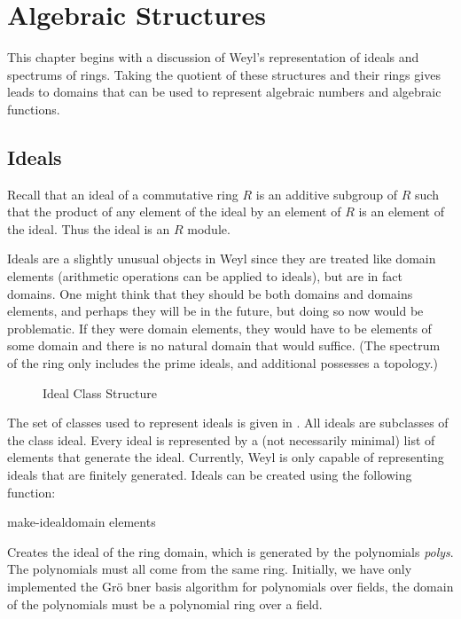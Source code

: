 \chapter{Algebraic Structures}
  
This chapter begins with a discussion
of Weyl's representation of ideals and spectrums of
rings. Taking the quotient of these structures and their
rings gives leads to domains that can be used to represent
algebraic numbers and algebraic functions.

\section{Ideals}
  
Recall that an ideal of a commutative ring $R$ is an additive
subgroup of $R$ such that the product of any element of the ideal by
an element of $R$ is an element of the ideal. Thus the ideal is an $R$
module.
  
Ideals are a slightly unusual objects in Weyl since they are treated
like domain elements (arithmetic operations can be applied to ideals),
but are in fact domains.  One might think that they should be both
domains and domains elements, and perhaps they will be in the future,
but doing so now would be problematic. If they were domain elements,
they would have to be elements of some domain and there is no natural
domain that would suffice.  (The spectrum of the ring only includes
the prime ideals, and additional possesses a topology.)
  
\begin{figure}
\begin{center}
\end{center}
\caption{Ideal Class Structure\label{Ideal:Classes:Fig}}
\end{figure}

The set of classes used to represent ideals is given in
.  All ideals are subclasses of the class
ideal. Every ideal is represented by a (not necessarily minimal) list
of elements that generate the ideal. Currently, Weyl is only capable
of representing ideals that are finitely generated. Ideals can be
created using the following function:
  
\begin{functiondef}{make-ideal}{domain \rest elements}
  
Creates the ideal of the ring domain, which is generated
by the polynomials {\em polys}. The polynomials must
all come from the same ring. Initially, we have only
implemented the Gr\"{o} bner basis algorithm for polynomials
over fields, the domain of the polynomials must be a
polynomial ring over a field.

\end{functiondef}
  

